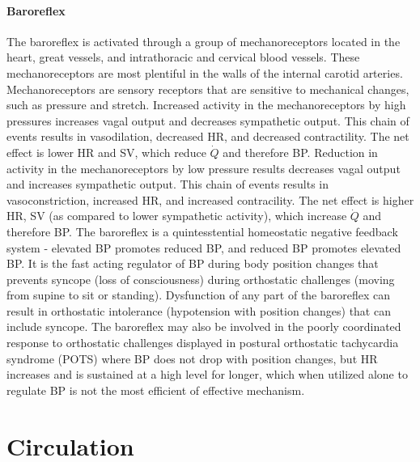 \paragraph{Baroreflex}

The baroreflex is activated through a group of mechanoreceptors located in the heart, great vessels, and intrathoracic and cervical blood vessels. These mechanoreceptors are most plentiful in the walls of the internal carotid arteries. Mechanoreceptors are sensory receptors that are sensitive to mechanical changes, such as pressure and stretch. Increased activity in the mechanoreceptors by high pressures increases vagal output and decreases sympathetic output. This chain of events results in vasodilation, decreased HR, and decreased contractility. The net effect is lower HR and SV, which reduce $\dot{Q}$ and therefore BP. Reduction in activity in the mechanoreceptors by low pressure results decreases vagal output and increases sympathetic output. This chain of events results in vasoconstriction, increased HR, and increased contracility. The net effect is higher HR,  SV (as compared to lower sympathetic activity), which increase $\dot{Q}$ and therefore BP. The baroreflex is a quintesstential homeostatic negative feedback system - elevated BP promotes reduced BP, and reduced BP promotes elevated BP. It is the fast acting regulator of BP during body position changes that prevents syncope (loss of consciousness) during orthostatic challenges  (moving from supine to sit or standing).
Dysfunction of any part of the baroreflex can result in orthostatic intolerance (hypotension with position changes) that can include syncope. The baroreflex may also be involved in the poorly coordinated response to orthostatic challenges displayed in postural orthostatic tachycardia syndrome (POTS) where BP does not drop with position changes, but HR increases and is sustained at a high level for longer, which when utilized alone to regulate BP is not the most efficient of effective mechanism.  













\section{Circulation}

